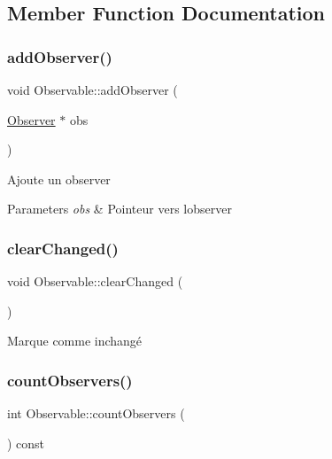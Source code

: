 \subsection{Member Function Documentation}
\mbox{\label{classObservable_af851f0a4c61f2acce7a270f774ad5cfb}} 
\subsubsection{\texorpdfstring{add\+Observer()}{addObserver()}}
{\footnotesize\ttfamily void Observable\+::add\+Observer (\begin{DoxyParamCaption}\item[{\hyperlink{classObserver}{Observer} $\ast$}]{obs }\end{DoxyParamCaption})}

Ajoute un observer


\begin{DoxyParams}{Parameters}
{\em obs} & Pointeur vers l\textquotesingle{}observer \\
\hline
\end{DoxyParams}
\mbox{\label{classObservable_a98b488f7ef648cf1da2c8bac7f0cce26}} 
\subsubsection{\texorpdfstring{clear\+Changed()}{clearChanged()}}
{\footnotesize\ttfamily void Observable\+::clear\+Changed (\begin{DoxyParamCaption}{ }\end{DoxyParamCaption})\hspace{0.3cm}{\ttfamily [protected]}}

Marque comme inchangé \mbox{\label{classObservable_a86a88f7a9d862e6dd192c76eb042cff1}} 
\subsubsection{\texorpdfstring{count\+Observers()}{countObservers()}}
{\footnotesize\ttfamily int Observable\+::count\+Observers (\begin{DoxyParamCaption}{ }\end{DoxyParamCaption}) const}


